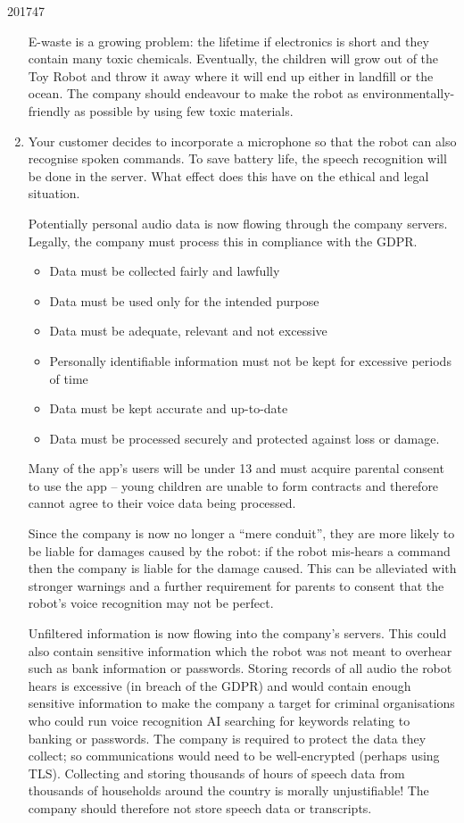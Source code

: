 \documentclass[10pt,\jkfside,a4paper]{article}
\begin{document}
\begin{examquestion}{2017}{4}{7}
\begin{enumerate}[label=(\alph*)]
E-waste is a growing problem: the lifetime if electronics is short and they
contain many toxic chemicals. Eventually, the children will grow out of the
Toy Robot and throw it away where it will end up either in landfill or
the ocean. The company should endeavour to make the robot as
environmentally-friendly as possible by using few toxic materials.

\item Your customer decides to incorporate a microphone so that the robot
can also recognise spoken commands. To save battery life, the speech
recognition will be done in the server. What effect does this have on the
ethical and legal situation.

Potentially personal audio data is now flowing through the company servers.
Legally, the company must process this in compliance with the GDPR\@.
\begin{itemize}
\item Data must be collected fairly and lawfully
\item Data must be used only for the intended purpose
\item Data must be adequate, relevant and not excessive
\item Personally identifiable information must not be kept for excessive
periods of time
\item Data must be kept accurate and up-to-date
\item Data must be processed securely and protected against loss or damage.
\end{itemize}

Many of the app's users will be under 13 and must acquire parental consent
to use the app -- young children are unable to form contracts and therefore
cannot agree to their voice data being processed.

Since the company is now no longer a ``mere conduit'', they are more likely
to be liable for damages caused by the robot: if the robot mis-hears a
command then the company is liable for the damage caused. This can be
alleviated with stronger warnings and a further requirement for parents to
consent that the robot's voice recognition may not be perfect.

Unfiltered information is now flowing into the company's servers. This
could also contain sensitive information which the robot was not meant to
overhear such as bank information or passwords. Storing records of all audio
the robot hears is excessive (in breach of the GDPR) and would contain
enough sensitive information to make the company a target for criminal
organisations who could run voice recognition AI searching for keywords
relating to banking or passwords. The company is required to protect the
data they collect; so communications would need to be well-encrypted
(perhaps using TLS). Collecting and storing thousands of hours of speech
data from thousands of households around the country is morally
unjustifiable! The company should therefore not store speech data or
transcripts.


\end{enumerate}
\end{examquestion}
\end{document}
